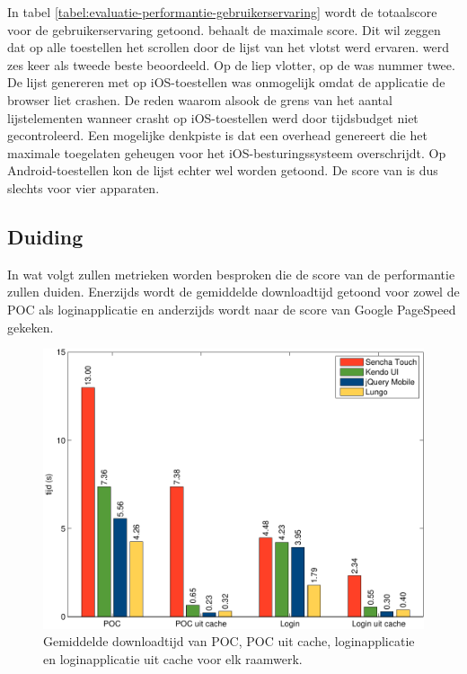 In tabel \ref{tabel:evaluatie-performantie-gebruikerservaring} wordt de totaalscore voor de gebruikerservaring getoond.
\st{} behaalt de maximale score.
Dit wil zeggen dat op alle toestellen het scrollen door de lijst van \st{} het vlotst werd ervaren.
\jqm{} werd zes keer als tweede beste beoordeeld. 
Op de \htc{} liep \kendo{} vlotter,  op de \ipadi{} was \lungo{} nummer twee.
De lijst genereren met \kendo{} op iOS-toestellen was onmogelijk omdat de applicatie de browser liet crashen.
De reden waarom alsook de grens van het aantal lijstelementen wanneer \kendo{} crasht op iOS-toestellen werd door tijdsbudget niet gecontroleerd.
Een mogelijke denkpiste is dat \kendo{} een overhead genereert die het maximale toegelaten geheugen voor het iOS-besturingssysteem overschrijdt.
Op Android-toestellen kon de lijst echter wel worden getoond.
De score van \kendo{} is dus slechts voor vier apparaten.


\subsection{Duiding}
\label{sec:evaluatie-performantie-duiding}

In wat volgt zullen metrieken worden besproken die de score van de performantie zullen duiden.
Enerzijds wordt de gemiddelde downloadtijd getoond voor zowel de POC als loginapplicatie en anderzijds wordt naar de score van Google PageSpeed gekeken.

\begin{figure}
 \centering
 \includegraphics[width=\textwidth]{figuren/performance-nl.pdf}
 \caption{Gemiddelde downloadtijd van POC,  POC uit cache,  loginapplicatie en loginapplicatie uit cache voor elk raamwerk.}
 \label{fig:performantie}
\end{figure}

